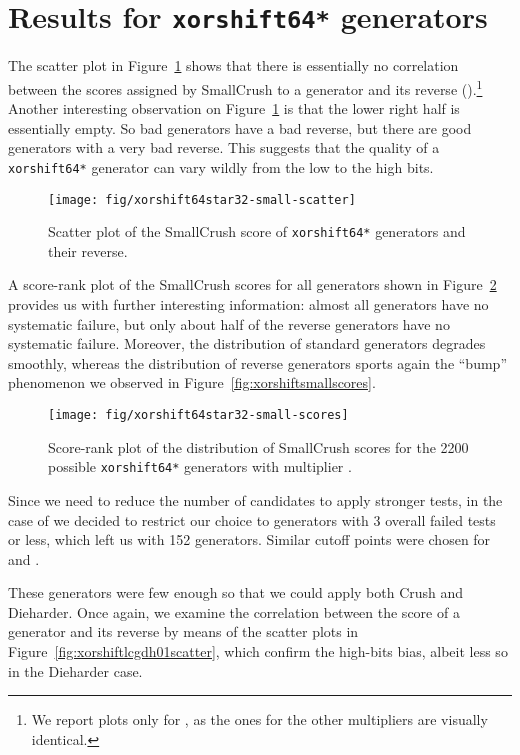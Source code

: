 \documentclass{acmsmalltr}
\newcommand{\xorshifts}[1][]{\texttt{xorshift#1*}\xspace}
\begin{document}
\section{Results for \xorshifts[64] generators}
\label{sec:resxorshifts}

The scatter plot in Figure~\ref{fig:xorshiftlcgcombscatter} shows that there is
essentially no correlation between the scores assigned by SmallCrush to a
generator and its reverse ().\footnote{We report
plots only for , as the ones for the other multipliers are visually identical.}
Another interesting observation on Figure~\ref{fig:xorshiftlcgcombscatter} is
that the lower right half is essentially empty. So bad generators have a bad
reverse, but there are good generators with a very bad reverse. This suggests
that the quality of a \xorshifts[64] generator can vary wildly from the low to the high bits.

\begin{figure}
\centering
\texttt{[image: fig/xorshift64star32-small-scatter]}
\caption{\label{fig:xorshiftlcgcombscatter}Scatter plot of the SmallCrush score
of \xorshifts[64] generators and their reverse.}
\end{figure}

A score-rank plot of the SmallCrush scores for all generators shown in
Figure~\ref{fig:xorshiftlcgsmallscores} provides us with further interesting
information: almost all generators have no systematic failure, but only about
half of the reverse generators have no systematic failure. Moreover, the
distribution of standard generators degrades smoothly, whereas the distribution
of reverse generators sports again the ``bump'' phenomenon we observed in
Figure~\ref{fig:xorshiftsmallscores}.

\begin{figure}
\centering
\texttt{[image: fig/xorshift64star32-small-scores]}
\caption{\label{fig:xorshiftlcgsmallscores}Score-rank plot of the distribution of SmallCrush scores for the 2200
possible \xorshifts[64] generators with multiplier .}
\end{figure}



Since we need to reduce the number of candidates to apply stronger tests, in the case of  we
decided to restrict our choice to generators with 3 overall failed tests or
less, which left us with 152 generators. Similar cutoff points were chosen for
 and .

These generators were few enough so that we could apply both Crush and
Dieharder. Once again, we examine the correlation between the score of a generator
and its reverse by means of the scatter plots in Figure~\ref{fig:xorshiftlcgdh01scatter},
which confirm the high-bits bias, albeit less so in the Dieharder case.
\end{document}
